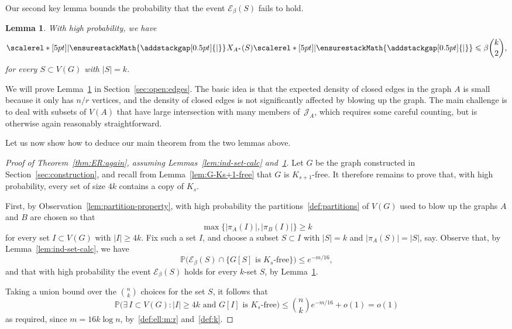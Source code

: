 \documentclass[12pt,reqno]{amsart}
\newcommand\pig[1]{\scalerel*[5pt]{\normalsize#1}{%
  \ensurestackMath{\addstackgap[0.5pt]{\normalsize#1}}}}
\newtheorem{lemma}[theorem]{Lemma}
\theoremstyle{remark}
\numberwithin{theorem}{section}
\renewcommand{\(}{\bigl(}
\renewcommand{\)}{\bigr)\vphantom{)}}
\newcommand{\cE}{\mathcal E}
\newcommand{\cJ}{\mathcal J}
\renewcommand{\le}{\leqslant}
\renewcommand{\ge}{\geqslant}
\renewcommand{\Pr}{\mathbb{P}}
\begin{document}
Our second key lemma bounds the probability that the event $\cE_\beta(S)$ fails to hold.

\begin{lemma}\label{lem:main-open-edges} 
With high probability, we have 
$$\pig| \hspace{0.015cm} X_{A^*}(S) \pig| \le \beta \binom{k}{2},$$
for every $S \subset V(G)$ with $|S| = k$. 
\end{lemma}

We will prove Lemma~\ref{lem:main-open-edges} in Section~\ref{sec:open:edges}. The basic idea is that the expected density of closed edges in the graph $A$ is small because it only has $n/r$ vertices, and the density of closed edges is not significantly affected by blowing up the graph. The main challenge is to deal with subsets of $V(A)$ that have large intersection with many members of~$\cJ_A$, which requires some careful counting, but is otherwise again reasonably straightforward. 

Let us now show how to deduce our main theorem from the two lemmas above. 

\begin{proof}[Proof of Theorem~\ref{thm:ER:again}, assuming Lemmas~\ref{lem:ind-set-calc} and~\ref{lem:main-open-edges}]
Let $G$ be the graph constructed in Section~\ref{sec:construction}, and recall from Lemma~\ref{lem:G-Ks+1-free} that $G$ is $K_{s+1}$-free. It therefore remains to prove that, with high probability, every set of size $4k$ contains a copy of $K_s$. 

First, by Observation~\ref{lem:partition-property}, with high probability the partitions~\eqref{def:partitions} of $V(G)$ used to blow up the graphs $A$ and $B$ are chosen so that
$$\max\big\{ |\pi_A(I)|,  |\pi_B(I)|\big\} \ge k$$
for every set $I \subset V(G)$ with $|I| \ge 4k$. Fix such a set $I$, and choose a subset $S \subset I$ with $|S| = k$ and $|\pi_A(S)| = |S|$, say. Observe that, by Lemma~\ref{lem:ind-set-calc}, we have
$$\Pr\Big( \cE_\beta(S) \cap \big\{ G[S] \text{ is $K_s$-free} \big\} \Big) \le e^{-m/16},$$
and that with high probability the event $\cE_\beta(S)$ holds for every $k$-set $S$, by Lemma~\ref{lem:main-open-edges}. 

Taking a union bound over the $\binom{n}{k}$ choices for the set $S$, it follows that 
$$\Pr\Big( \exists \, I \subset V(G) : |I| \ge 4k \text{ and } G[I] \text{ is $K_s$-free} \Big) \le \binom{n}{k} e^{-m/16} + o(1) = o(1)$$
as required, since $m = 16 k \log n$, by~\eqref{def:ell:m:r} and~\eqref{def:k}.
\end{proof}
\end{document}
